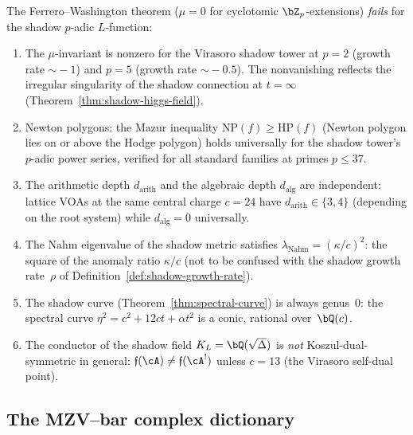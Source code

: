\begin{remark}
\label{rem:ferrero-washington-failure}
The Ferrero--Washington theorem ($\mu = 0$ for cyclotomic
$\bZ_p$-extensions) \emph{fails} for the shadow
$p$-adic $L$-function:
\begin{enumerate}[label=\textup{(\roman*)}]
\item The $\mu$-invariant is nonzero for the Virasoro
 shadow tower at $p = 2$ (growth rate $\sim\! -1$) and
 $p = 5$ (growth rate $\sim\! -0.5$). The nonvanishing
 reflects the irregular singularity of the shadow
 connection at $t = \infty$
 (Theorem~\ref{thm:shadow-higgs-field}).
\item Newton polygons: the Mazur inequality
 $\mathrm{NP}(f) \ge \mathrm{HP}(f)$ (Newton polygon
 lies on or above the Hodge polygon) holds universally
 for the shadow tower's $p$-adic power series,
 verified for all standard families at primes
 $p \le 37$.
\item The arithmetic depth $d_{\mathrm{arith}}$ and the
 algebraic depth $d_{\mathrm{alg}}$ are independent:
 lattice VOAs at the same central charge $c = 24$
 have $d_{\mathrm{arith}} \in \{3, 4\}$
 (depending on the root system) while
 $d_{\mathrm{alg}} = 0$ universally.
\item The Nahm eigenvalue of the shadow metric satisfies
 $\lambda_{\mathrm{Nahm}} = (\kappa/c)^2$: the square
 of the anomaly ratio $\kappa/c$ (not to be confused
 with the shadow growth rate~$\rho$ of
 Definition~\textup{\ref{def:shadow-growth-rate}}).
\item The shadow curve
 (Theorem~\ref{thm:spectral-curve}) is always genus~$0$:
 the spectral curve $\eta^2 = c^2 + 12ct + \alpha t^2$
 is a conic, rational over~$\bQ(c)$.
\item The conductor of the shadow field
 $K_L = \bQ(\sqrt{\Delta})$ is \emph{not}
 Koszul-dual-symmetric in general: $\mathfrak{f}(\cA)
 \neq \mathfrak{f}(\cA^!)$ unless $c = 13$
 (the Virasoro self-dual point).
\end{enumerate}
\end{remark}

\subsection{The MZV--bar complex dictionary}%
\label{subsec:mzv-bar-complex}%
%
%

